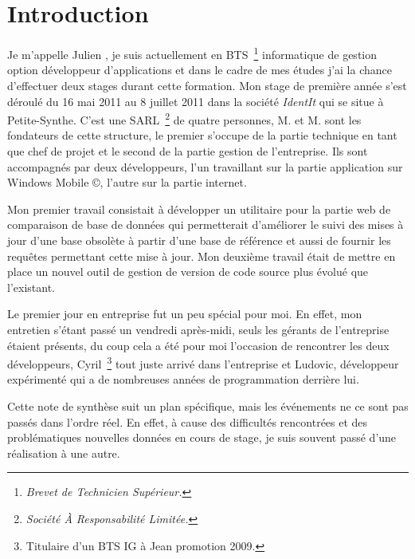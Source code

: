 \chapter{Introduction} %
\label{cha:Introduction}

Je m'appelle Julien , je suis actuellement en BTS\,
\footnote{\emph{Brevet de Technicien Supérieur.}} informatique de gestion
option développeur d'applications et dans le cadre de mes études j'ai la chance
d'effectuer deux stages durant cette formation. Mon stage de première année
s'est déroulé du 16 mai 2011 au 8 juillet 2011 dans la société \emph{IdentIt}
qui se situe à Petite-Synthe. C'est une SARL\, \footnote{\emph{Société À
Responsabilité Limitée.}} de quatre personnes, M. et
M. sont les fondateurs de cette structure, le premier s'occupe de
la partie technique en tant que chef de projet et le second de la partie
gestion de l'entreprise. Ils sont accompagnés par deux développeurs, l'un
travaillant sur la partie application sur Windows Mobile \copyright, l'autre
sur la partie internet.

Mon premier travail consistait à développer un utilitaire pour la partie web de
comparaison de base de données qui permetterait d'améliorer le suivi des mises
à jour d'une base obsolète à partir d'une base de référence et aussi de fournir
les requêtes permettant cette mise à jour. Mon deuxième travail était de mettre
en place un nouvel outil de gestion de version de code source plus évolué que
l'existant.

Le premier jour en entreprise fut un peu spécial pour moi. En effet, mon
entretien s'étant passé un vendredi après-midi, seuls les gérants de
l'entreprise étaient présents, du coup cela a été pour moi l'occasion de
rencontrer les deux développeurs, Cyril\, \footnote{Titulaire d'un BTS IG à
Jean  promotion 2009.} tout juste arrivé dans l'entreprise et
Ludovic, développeur expérimenté qui a de nombreuses années de programmation
derrière lui.

Cette note de synthèse suit un plan spécifique, mais les événements ne ce sont
pas passés dans l'ordre réel. En effet, à cause des difficultés rencontrées et
des problématiques nouvelles données en cours de stage, je suis souvent passé
d'une réalisation à une autre.
